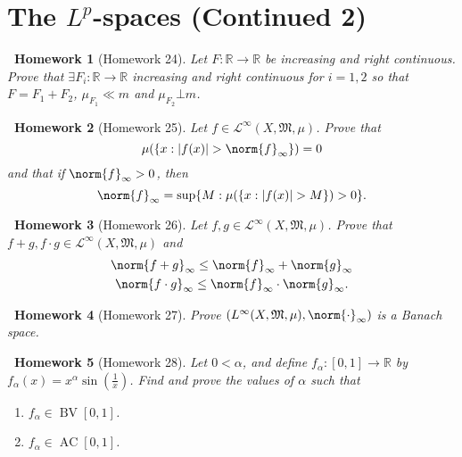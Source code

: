 \documentclass[notoc,notitlepage]{tufte-book}
\DeclareMathOperator{\AC}{AC}
\DeclareMathOperator{\BV}{BV}
\newtheorem*{homework}{\faCogs\ Homework}
\begin{document}
\section{The \texorpdfstring{$L^p$}{Lp}-spaces (Continued 2)}%
\label{sec:the_l_p_spaces_continued_2}

\begin{homework}[Homework 24]\label{homework:24}
  Let $F : \mathbb{R} \to \mathbb{R}$ be increasing and right continuous.
  Prove that $\exists F_i : \mathbb{R} \to \mathbb{R}$ increasing and right
  continuous for $i = 1, 2$ so that $F = F_1 + F_2$,
  $\mu_{F_1} \ll m$ and $\mu_{F_2} \bot m$.
\end{homework}

\begin{homework}[Homework 25]\label{homework:25}
  Let $f \in \mathcal{L}^{\infty}(X, \mathfrak{M}, \mu)$.
  Prove that
  \begin{equation*}
    \mu(\{ x : \abs{f(x)} > \norm{f}_{\infty} \}) = 0
  \end{equation*}
  and that if $\norm{f}_{\infty} > 0$, then
  \begin{equation*}
    \norm{f}_{\infty} = \sup \{ M : \mu(\{ x : \abs{f(x)} > M \}) > 0 \}.
  \end{equation*}
\end{homework}

\begin{homework}[Homework 26]\label{homework:26}
  Let $f, g \in \mathcal{L}^{\infty}(X, \mathfrak{M}, \mu)$.
  Prove that $f + g, f \cdot g \in \mathcal{L}^{\infty}(X, \mathfrak{M}, \mu)$
  and
  \begin{gather*}
    \norm{f + g}_{\infty} \leq \norm{f}_{\infty} + \norm{g}_{\infty} \\
    \norm{f \cdot g}_{\infty} \leq \norm{f}_{\infty} \cdot \norm{g}_{\infty}.
  \end{gather*}
\end{homework}

\begin{homework}[Homework 27]\label{homework:27}
  Prove $(L^{\infty}(X, \mathfrak{M}, \mu), \norm{\cdot}_{\infty})$
  is a Banach space.
\end{homework}

\begin{homework}[Homework 28]\label{homework:28}
  Let $0 < \alpha$, and define $f_{\alpha} : [0, 1] \to \mathbb{R}$
  by $f_{\alpha}(x) = x^{\alpha} \sin \left( \frac{1}{x} \right)$.
  Find and prove the values of $\alpha$ such that
  \begin{enumerate}
    \item $f_{\alpha} \in \BV[0, 1]$.
    \item $f_{\alpha} \in \AC[0, 1]$.
  \end{enumerate}
\end{homework}
\end{document}
